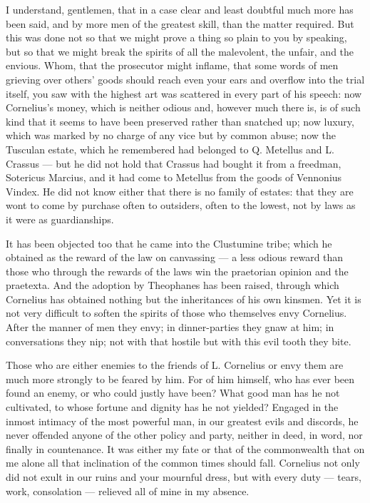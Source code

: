  I understand, gentlemen, that in a case clear and least doubtful much more has been said, and by more men of the greatest skill, than the matter required. But this was done not so that we might prove a thing so plain to you by speaking, but so that we might break the spirits of all the malevolent, the unfair, and the envious. Whom, that the prosecutor might inflame, that some words of men grieving over others' goods should reach even your ears and overflow into the trial itself, you saw with the highest art was scattered in every part of his speech: now Cornelius's money, which is neither odious and, however much there is, is of such kind that it seems to have been preserved rather than snatched up; now luxury, which was marked by no charge of any vice but by common abuse; now the Tusculan estate, which he remembered had belonged to Q. Metellus and L. Crassus --- but he did not hold that Crassus had bought it from a freedman, Sotericus Marcius, and it had come to Metellus from the goods of Vennonius Vindex. He did not know either that there is no family of estates: that they are wont to come by purchase often to outsiders, often to the lowest, not by laws as it were as guardianships.

 It has been objected too that he came into the Clustumine tribe; which he obtained as the reward of the law on canvassing --- a less odious reward than those who through the rewards of the laws win the praetorian opinion and the praetexta. And the adoption by Theophanes has been raised, through which Cornelius has obtained nothing but the inheritances of his own kinsmen. Yet it is not very difficult to soften the spirits of those who themselves envy Cornelius. After the manner of men they envy; in dinner-parties they gnaw at him; in conversations they nip; not with that hostile but with this evil tooth they bite.

 Those who are either enemies to the friends of L. Cornelius or envy them are much more strongly to be feared by him. For of him himself, who has ever been found an enemy, or who could justly have been? What good man has he not cultivated, to whose fortune and dignity has he not yielded? Engaged in the inmost intimacy of the most powerful man, in our greatest evils and discords, he never offended anyone of the other policy and party, neither in deed, in word, nor finally in countenance. It was either my fate or that of the commonwealth that on me alone all that inclination of the common times should fall. Cornelius not only did not exult in our ruins and your mournful dress, but with every duty --- tears, work, consolation --- relieved all of mine in my absence.

